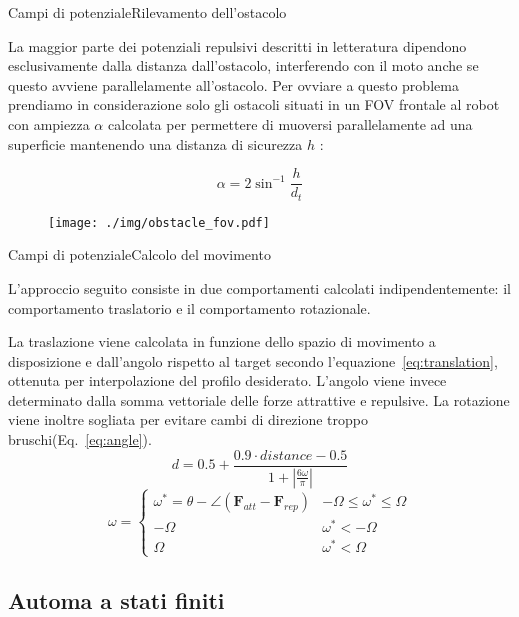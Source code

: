\documentclass[aspectratio=169, leqno]{beamer}
\begin{document}
	\begin{frame}{Campi di potenziale}{Rilevamento dell'ostacolo}

	La maggior parte dei potenziali repulsivi descritti in letteratura
	dipendono esclusivamente dalla distanza dall'ostacolo, interferendo con il
	moto anche se questo avviene parallelamente all'ostacolo. Per ovviare a
	questo problema prendiamo in considerazione solo gli ostacoli situati in un
	FOV frontale al robot con ampiezza $ \alpha  $ calcolata per permettere di
	muoversi parallelamente ad una superficie mantenendo una distanza di
	sicurezza $ h $ : 

	\begin{equation}\label{eq:obstacle_fov}
		\alpha = {2}\sin^{-1}{\frac{h}{d_t}}
	\end{equation}

	\begin{figure}[H]
		\centering
		\texttt{[image: ./img/obstacle\_fov.pdf]}
		\label{fig:obstacle_fov}
	\end{figure}
	
	\end{frame}
	\begin{frame}{Campi di potenziale}{Calcolo del movimento}

	L'approccio seguito consiste in due comportamenti calcolati
	indipendentemente: il comportamento traslatorio e il comportamento
	rotazionale.

	La traslazione viene calcolata in funzione dello spazio di movimento a
	disposizione e dall'angolo rispetto al target secondo
	l'equazione~\ref{eq:translation}, ottenuta per interpolazione del profilo
	desiderato. L'angolo viene invece determinato dalla somma vettoriale delle
	forze attrattive e repulsive. La rotazione viene inoltre sogliata per
	evitare cambi di direzione troppo bruschi(Eq.~\ref{eq:angle}).
	\begin{equation}\label{eq:translation}
		d = 0.5 + \frac	{0.9\cdot distance - 0.5}
		{1 + \left|
				\frac{6\omega}{\pi}
		\right|  } 
	\end{equation}
	\begin{equation}\label{eq:angle}
		\omega = \begin{cases}
			\omega^*=\theta - \angle\left( \textbf{F}_{att} - \textbf{F}_{rep} \right)  & -\Omega \le \omega^* \le \Omega \\
			-\Omega & \omega^* < -\Omega \\
			\Omega & \omega^* < \Omega

		\end{cases}	\end{equation}
	
	\subsection{Automa a stati finiti}\label{subsec:Pianificazione}
	
	\end{frame}
\end{document}
